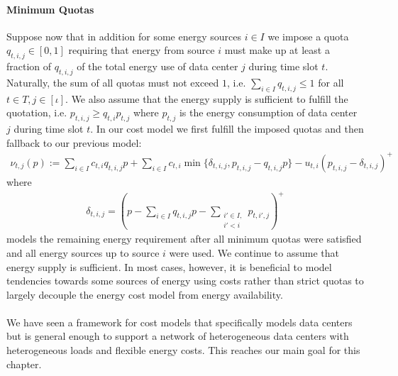 \paragraph{Minimum Quotas} Suppose now that in addition for some energy sources $i \in I$ we impose a quota $q_{t,i,j} \in [0,1]$ requiring that energy from source $i$ must make up at least a fraction of $q_{t,i,j}$ of the total energy use of data center $j$ during time slot $t$. Naturally, the sum of all quotas must not exceed $1$, i.e. $\sum_{i \in I} q_{t,i,j} \leq 1$ for all $t \in T, j \in [\iota]$. We also assume that the energy supply is sufficient to fulfill the quotation, i.e. $p_{t,i,j} \geq q_{t,i} p_{t,j}$ where $p_{t,j}$ is the energy consumption of data center $j$ during time slot $t$. In our cost model we first fulfill the imposed quotas and then fallback to our previous model: \begin{align*}
    \nu_{t,j}(p) := \sum_{i \in I} c_{t,i} q_{t,i,j} p + \sum_{i \in I} c_{t,i} \min\{\delta_{t,i,j}, p_{t,i,j} - q_{t,i,j} p\} - u_{t,i} (p_{t,i,j} - \delta_{t,i,j})^+
\end{align*} where \begin{align*}
    \delta_{t,i,j} = (p - \sum_{i \in I} q_{t,i,j} p - \sum_{\substack{i' \in I, \\ i' < i}} p_{t,i',j})^+
\end{align*} models the remaining energy requirement after all minimum quotas were satisfied and all energy sources up to source $i$ were used. We continue to assume that energy supply is sufficient. In most cases, however, it is beneficial to model tendencies towards some sources of energy using costs rather than strict quotas to largely decouple the energy cost model from energy availability.

\paragraph{}{We have seen a framework for cost models that specifically models data centers but is general enough to support a network of heterogeneous data centers with heterogeneous loads and flexible energy costs. This reaches our main goal for this chapter.}
